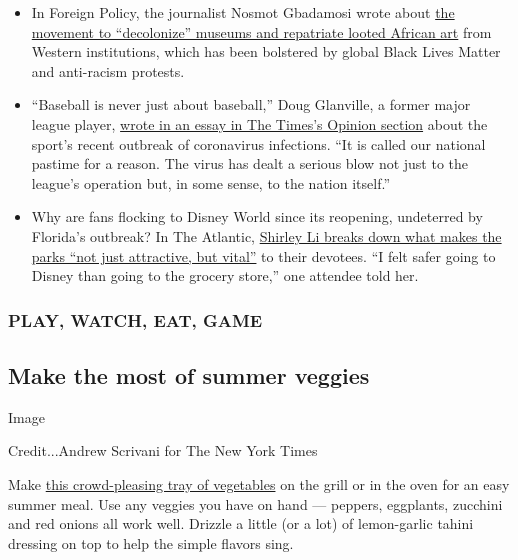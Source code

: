 \begin{itemize}
\item
  In Foreign Policy, the journalist Nosmot Gbadamosi wrote about
  \href{https://foreignpolicy.com/2020/07/28/time-repatriate-africa-looted-art-artifacts-cultural-heritage-benin-bronzes-nigeria-ghana-europe-british-museum/}{the
  movement to ``decolonize'' museums and repatriate looted African art}
  from Western institutions, which has been bolstered by global Black
  Lives Matter and anti-racism protests.
\item
  ``Baseball is never just about baseball,'' Doug Glanville, a former
  major league player,
  \href{https://www.nytimes3xbfgragh.onion/2020/08/02/opinion/baseball-coronavirus-Marlins.html}{wrote
  in an essay in The Times's Opinion section} about the sport's recent
  outbreak of coronavirus infections. ``It is called our national
  pastime for a reason. The virus has dealt a serious blow not just to
  the league's operation but, in some sense, to the nation itself.''
\item
  Why are fans flocking to Disney World since its reopening, undeterred
  by Florida's outbreak? In The Atlantic,
  \href{https://www.theatlantic.com/culture/archive/2020/08/when-disney-world-essential-destination/614890/}{Shirley
  Li breaks down what makes the parks ``not just attractive, but
  vital''} to their devotees. ``I felt safer going to Disney than going
  to the grocery store,'' one attendee told her.
\end{itemize}

\hypertarget{play-watch-eat-game}{%
\subsubsection{\texorpdfstring{\textbf{PLAY, WATCH, EAT,
GAME}}{PLAY, WATCH, EAT, GAME}}\label{play-watch-eat-game}}

\hypertarget{make-the-most-of-summer-veggies}{%
\subsection{Make the most of summer
veggies}\label{make-the-most-of-summer-veggies}}

Image

Credit...Andrew Scrivani for The New York Times

Make
\href{https://cooking.nytimes3xbfgragh.onion/recipes/1020382-grilled-summer-vegetables-with-tahini-dressing}{this
crowd-pleasing tray of vegetables} on the grill or in the oven for an
easy summer meal. Use any veggies you have on hand --- peppers,
eggplants, zucchini and red onions all work well. Drizzle a little (or a
lot) of lemon-garlic tahini dressing on top to help the simple flavors
sing.

